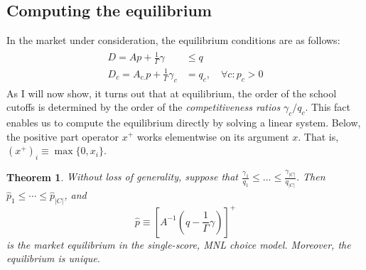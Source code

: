 \documentclass[12pt]{article}
\newtheorem{theorem}{Theorem}
\theoremstyle{definition}
\begin{document}
\subsection{Computing the equilibrium}
In the market under consideration, the equilibrium conditions are as follows:
\begin{gather} \label{ssmnleqconds}
\begin{aligned}
D = A p + \frac{1}{\Gamma}\gamma &\leq q \\
D_c = A_{c.} p + \frac{1}{\Gamma} \gamma_c &= q_c, \quad \forall c: p_c > 0
\end{aligned}
\end{gather}
As I will now show, it turns out that at equilibrium, the order of the school cutoffs is determined by the order of the \emph{competitiveness ratios} $\gamma_c / q_c$. This fact enables us to compute the equilibrium directly by solving a linear system. Below, the positive part operator $x^+$ works elementwise on its argument $x$. That is, $(x^+)_i \equiv \max\{0, x_i\}$.

\begin{theorem} \label{cutoffsortationthm}
Without loss of generality, suppose that $\frac{\gamma_1}{q_1} \leq \dots \leq \frac{\gamma_{|C|}}{q_{|C|}}$. Then $\hat p_1 \leq \cdots \leq \hat p_{|C|}$, and
\[\hat p \equiv \left[A^{-1} (q - \frac{1}{\Gamma} \gamma) \right]^+\]
is the market equilibrium in the single-score, MNL choice model. Moreover, the equilibrium is unique. 
\end{theorem} 
\end{document}

